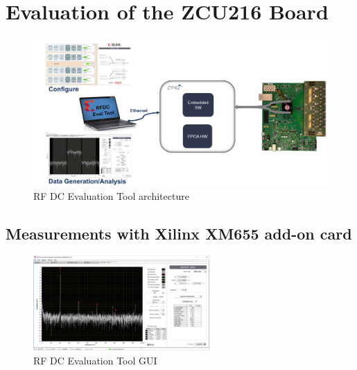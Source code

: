 \section{Evaluation of the ZCU216 Board}

\begin{figure}[H]
	\centering
	\includegraphics[width = \textwidth]{chap/04-characterization/img/zcu216evaltool.png}
	\caption{RF DC Evaluation Tool architecture \cite{zcu216evaltool}}
	\label{fig:evaltool}
\end{figure}


\subsection{Measurements with Xilinx XM655 add-on card}
\begin{figure}[H]
	\centering
	\includegraphics[width = 0.6\textwidth]{chap/04-characterization/img/evaltool.png}
	\caption{RF DC Evaluation Tool GUI \cite{zcu216evaltool}}
	\label{fig:evalgui}
\end{figure}


